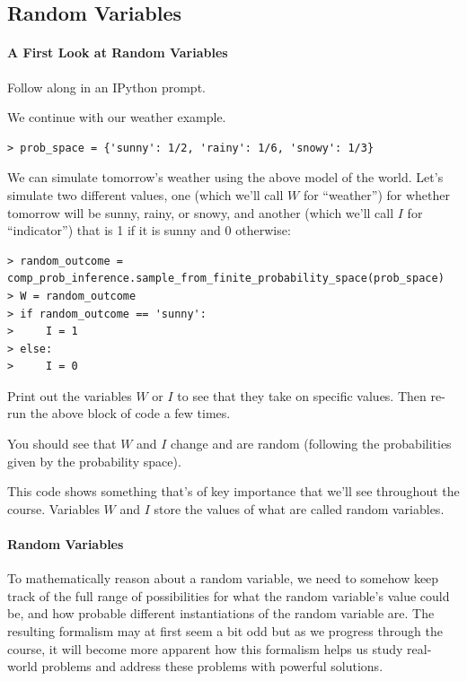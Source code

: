 \documentclass[6008notes.tex]{subfiles}
\begin{document}
\graphicspath{ {images/randvar/} }

\subsection{Random Variables}

\paragraph{A First Look at Random Variables}
Follow along in an IPython prompt.

We continue with our weather example.

\begin{lstlisting}
> prob_space = {'sunny': 1/2, 'rainy': 1/6, 'snowy': 1/3}
\end{lstlisting}

We can simulate tomorrow's weather using the above model of the world. Let's simulate two different values, one (which we'll call $W$ for ``weather'') for whether tomorrow will be sunny, rainy, or snowy, and another (which we'll call $I$ for ``indicator'') that is 1 if it is sunny and 0 otherwise:

\begin{lstlisting}
> random_outcome = comp_prob_inference.sample_from_finite_probability_space(prob_space)
> W = random_outcome
> if random_outcome == 'sunny':
>     I = 1
> else:
>     I = 0
\end{lstlisting}

Print out the variables $W$ or $I$ to see that they take on specific values. Then re-run the above block of code a few times.

You should see that $W$ and $I$ change and are random (following the probabilities given by the probability space).

This code shows something that's of key importance that we'll see throughout the course. Variables $W$ and $I$ store the values of what are called random variables.

\paragraph{Random Variables}

To mathematically reason about a random variable, we need to somehow keep track of the full range of possibilities for what the random variable's value could be, and how probable different instantiations of the random variable are. The resulting formalism may at first seem a bit odd but as we progress through the course, it will become more apparent how this formalism helps us study real-world problems and address these problems with powerful solutions.
\end{document}
